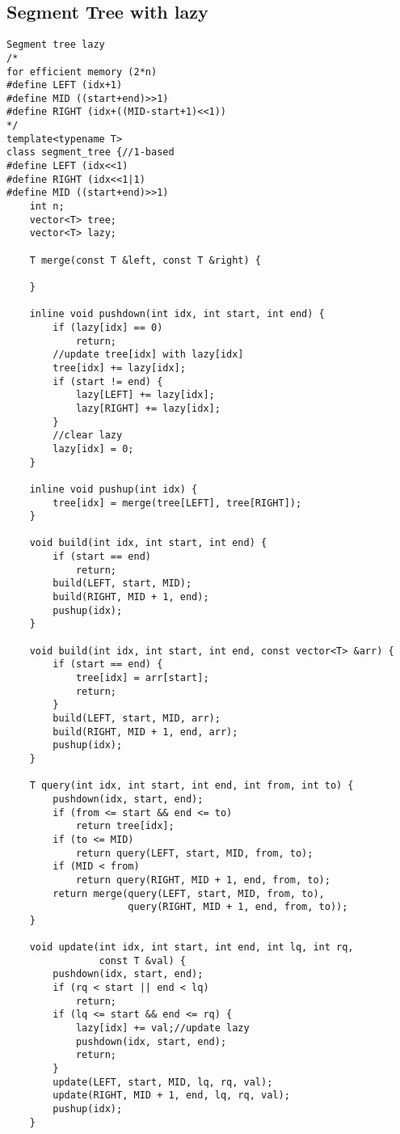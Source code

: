 \documentclass{article}
\begin{document}
\subsection{Segment Tree with lazy}
\begin{verbatim}
Segment tree lazy
/*
for efficient memory (2*n)
#define LEFT (idx+1)
#define MID ((start+end)>>1)
#define RIGHT (idx+((MID-start+1)<<1))
*/
template<typename T>
class segment_tree {//1-based
#define LEFT (idx<<1)
#define RIGHT (idx<<1|1)
#define MID ((start+end)>>1)
    int n;
    vector<T> tree;
    vector<T> lazy;

    T merge(const T &left, const T &right) {
    
    }

    inline void pushdown(int idx, int start, int end) {
        if (lazy[idx] == 0)
            return;
        //update tree[idx] with lazy[idx]
        tree[idx] += lazy[idx];
        if (start != end) {
            lazy[LEFT] += lazy[idx];
            lazy[RIGHT] += lazy[idx];
        }
        //clear lazy
        lazy[idx] = 0;
    }

    inline void pushup(int idx) {
        tree[idx] = merge(tree[LEFT], tree[RIGHT]);
    }

    void build(int idx, int start, int end) {
        if (start == end)
            return;
        build(LEFT, start, MID);
        build(RIGHT, MID + 1, end);
        pushup(idx);
    }

    void build(int idx, int start, int end, const vector<T> &arr) {
        if (start == end) {
            tree[idx] = arr[start];
            return;
        }
        build(LEFT, start, MID, arr);
        build(RIGHT, MID + 1, end, arr);
        pushup(idx);
    }

    T query(int idx, int start, int end, int from, int to) {
        pushdown(idx, start, end);
        if (from <= start && end <= to)
            return tree[idx];
        if (to <= MID)
            return query(LEFT, start, MID, from, to);
        if (MID < from)
            return query(RIGHT, MID + 1, end, from, to);
        return merge(query(LEFT, start, MID, from, to),
                     query(RIGHT, MID + 1, end, from, to));
    }

    void update(int idx, int start, int end, int lq, int rq,
                const T &val) {
        pushdown(idx, start, end);
        if (rq < start || end < lq)
            return;
        if (lq <= start && end <= rq) {
            lazy[idx] += val;//update lazy
            pushdown(idx, start, end);
            return;
        }
        update(LEFT, start, MID, lq, rq, val);
        update(RIGHT, MID + 1, end, lq, rq, val);
        pushup(idx);
    }


\end{verbatim}
\end{document}
